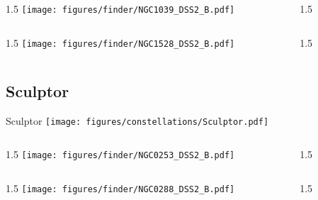 \documentclass[final]{beamer}
\newlength{\colwidth}
\begin{document}

\begin{frame}[t]{}
  \begin{columns}[T]
    \begin{column}{1.5\colwidth}
      \centering
      \texttt{[image: figures/finder/NGC1039\_DSS2\_B.pdf]}
    \end{column}
    \begin{column}{1.5\colwidth}
      \Large
      
    \end{column}
  \end{columns}
  \vspace{\fill}
  \begin{columns}[T]
    \begin{column}{1.5\colwidth}
      \centering
      \texttt{[image: figures/finder/NGC1528\_DSS2\_B.pdf]}
    \end{column}
    \begin{column}{1.5\colwidth}
      \Large
      
    \end{column}
  \end{columns}
\end{frame}

\subsection{Sculptor}

\begin{frame}[t]{\LARGE Sculptor}
  \centering
  \texttt{[image: figures/constellations/Sculptor.pdf]}
\end{frame}


\begin{frame}[t]{}
  \begin{columns}[T]
    \begin{column}{1.5\colwidth}
      \centering
      \texttt{[image: figures/finder/NGC0253\_DSS2\_B.pdf]}
    \end{column}
    \begin{column}{1.5\colwidth}
      \Large
      
    \end{column}
  \end{columns}
  \vspace{\fill}
  \begin{columns}[T]
    \begin{column}{1.5\colwidth}
      \centering
      \texttt{[image: figures/finder/NGC0288\_DSS2\_B.pdf]}
    \end{column}
    \begin{column}{1.5\colwidth}
      \Large
      
    \end{column}
  \end{columns}
\end{frame}
\end{document}

